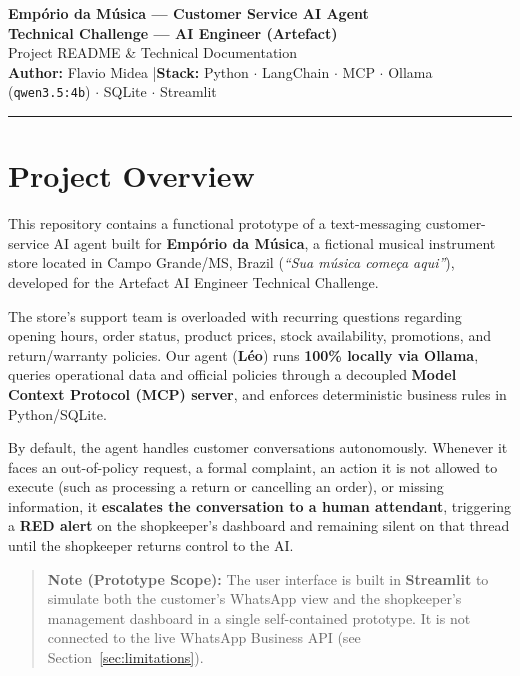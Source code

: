 \documentclass[11pt,a4paper]{article}
\begin{document}
\begin{center}
    {\LARGE\bfseries\color{primary} Emp\'orio da M\'usica --- Customer Service AI Agent}\\[0.4em]
    {\large\bfseries Technical Challenge --- AI Engineer (Artefact)}\\[0.3em]
    {\normalsize Project README \& Technical Documentation}\\[0.5em]
    {\small\textbf{Author:} Flavio Midea \quad|\quad \textbf{Stack:} Python $\cdot$ LangChain $\cdot$ MCP $\cdot$ Ollama (\texttt{qwen3.5:4b}) $\cdot$ SQLite $\cdot$ Streamlit}
\end{center}
\vspace{0.3em}
\hrule
\vspace{0.8em}

\section{Project Overview}

This repository contains a functional prototype of a text-messaging customer-service AI agent built for \textbf{Emp\'orio da M\'usica}, a fictional musical instrument store located in Campo Grande/MS, Brazil (\textit{``Sua m\'usica come\c{c}a aqui''}), developed for the Artefact AI Engineer Technical Challenge.

The store's support team is overloaded with recurring questions regarding opening hours, order status, product prices, stock availability, promotions, and return/warranty policies. Our agent (\textbf{L\'eo}) runs \textbf{100\% locally via Ollama}, queries operational data and official policies through a decoupled \textbf{Model Context Protocol (MCP) server}, and enforces deterministic business rules in Python/SQLite.

By default, the agent handles customer conversations autonomously. Whenever it faces an out-of-policy request, a formal complaint, an action it is not allowed to execute (such as processing a return or cancelling an order), or missing information, it \textbf{escalates the conversation to a human attendant}, triggering a \textcolor{alertred}{\textbf{RED alert}} on the shopkeeper's dashboard and remaining silent on that thread until the shopkeeper returns control to the AI.

\begin{quote}
\textbf{Note (Prototype Scope):} The user interface is built in \textbf{Streamlit} to simulate both the customer's WhatsApp view and the shopkeeper's management dashboard in a single self-contained prototype. It is not connected to the live WhatsApp Business API (see Section~\ref{sec:limitations}).
\end{quote}
\end{document}
